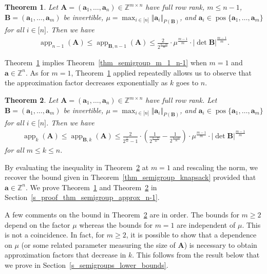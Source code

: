 \documentclass[pdflatex]{sn-jnl}
\DeclareMathOperator{\app}{app}
\DeclareMathOperator{\pos}{pos}
\newcommand{\Z}{\mathbb{Z}}
\newcommand{\bA}{\bm{A}}
\newcommand{\ba}{\bm{a}}
\newcommand{\bB}{\bm{B}}
\theoremstyle{thmstyleone}%
\newtheorem{theorem}{Theorem}%
\theoremstyle{thmstyletwo}%
\theoremstyle{thmstylethree}%
\begin{document}
	\begin{theorem}
		\label{thm_semigroup_approx_n-1}
		Let $\bA = (\ba_1,\ldots,\ba_n)\in\Z^{m\times n}$ have full row rank, $m \leq n - 1$, $\bB = (\ba_1,\ldots,\ba_m)$ be invertible, $\mu = \max_{i\in\lbrack n\rbrack}\Vert\ba_i\Vert_{P(\bB)}$, and $\ba_i\in\pos\lbrace\ba_1,\ldots,\ba_m\rbrace$ for all $i\in\lbrack n\rbrack$. Then we have 
		\begin{align*}
			\app_{n-1}(\bA)\leq\app_{\bB,n-1}(\bA) \leq \frac{2}{2^\frac{n-m}{m}} \cdot \mu^{\frac{m-1}{m}}\cdot\left|\det\bB\right|^{\frac{m-1}{m}}.
		\end{align*}
	\end{theorem}
	Theorem~\ref{thm_semigroup_approx_n-1} implies  Theorem~\ref{thm_semigroup_m_1_n-1} when $m=1$ and $\ba \in \Z^n$.
	As for $m=1$, Theorem~\ref{thm_semigroup_approx_n-1} applied repeatedly allows us to  observe that the approximation factor decreases exponentially  as $k$ goes to $n$.
	\begin{theorem} 
		\label{thm_semigroup_general_bound}
		Let $\bA = (\ba_1,\ldots,\ba_n)\in\Z^{m\times n}$ have full row rank. Let $\bB = (\ba_1,\ldots,\ba_m)$ be invertible, $\mu = \max_{i\in\lbrack n\rbrack}\Vert\ba_i\Vert_{P(\bB)}$, and $\ba_i\in\pos\lbrace\ba_1,\ldots,\ba_m\rbrace$ for all $i\in\lbrack n\rbrack$. Then we have
		\begin{align*}
			\app_k(\bA)\leq \app_{\bB,k}(\bA) \leq \frac{{2}}{2^{\frac{1}{m}} - 1}\cdot \left(\frac{1}{2^{\frac{k-m}{m}}} - \frac{1}{2^{\frac{n-m}{m}}}\right)\cdot \mu^{\frac{m-1}{m}}\cdot \left|\det\bB\right|^{\frac{m-1}{m}}
		\end{align*}
		for all $m\leq k\leq n$.
	\end{theorem}
	By evaluating the inequality in Theorem~\ref{thm_semigroup_general_bound} at $m = 1$ and rescaling the norm, we recover the bound given in Theorem~\ref{thm_semigroup_knapsack} provided that $\ba \in \Z^n$. We prove Theorem~\ref{thm_semigroup_approx_n-1} and Theorem~\ref{thm_semigroup_general_bound} in Section~\ref{s_proof_thm_semigroup_approx_n-1}. 
	
	A few comments on the bound in Theorem~\ref{thm_semigroup_general_bound} are in order. The bounds for $m\geq 2$ depend on the factor $\mu$ whereas the bounds for $m = 1$ are independent of $\mu$. This is not a coincidence. 
	In fact, for $m\geq 2$, it is possible to show that a dependence on $\mu$ (or some related parameter  measuring the size of $\bA$) is necessary to obtain approximation factors that decrease in $k$. This follows from the result below that we prove in Section~\ref{s_semigroups_lower_bounds}.
	
\end{document}
